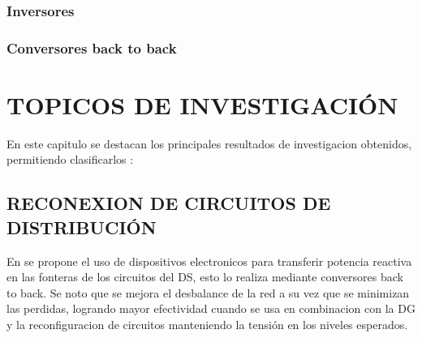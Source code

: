\documentclass[12pt, letterpaper]{report}
\begin{document}
\subsection{Inversores}
\subsection{Conversores back to back}

\chapter{TOPICOS  DE INVESTIGACIÓN}
En este capitulo se destacan los principales resultados de investigacion obtenidos, permitiendo clasificarlos :\\
\section{RECONEXION DE CIRCUITOS DE DISTRIBUCIÓN}
En \cite{Cao2016} se propone el uso de dispositivos electronicos para transferir potencia reactiva en las fonteras de los circuitos del DS, esto lo realiza mediante conversores back to back. Se noto que se mejora el desbalance de la red a su vez que se minimizan las perdidas, logrando mayor efectividad cuando se usa en combinacion con la DG y la reconfiguracion de circuitos manteniendo la tensión en los niveles esperados.\\
\end{document}
